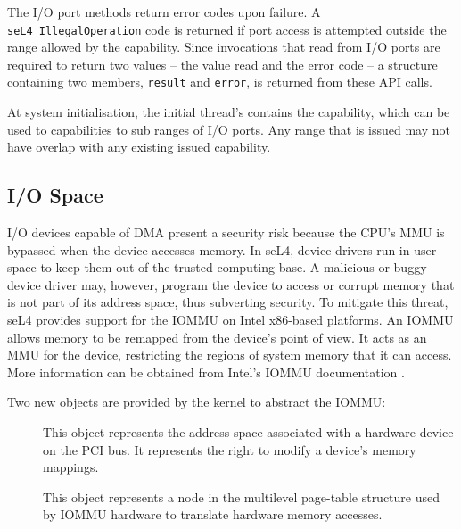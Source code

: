 The I/O port methods return error codes upon failure.
A \texttt{seL4\_IllegalOperation} code is returned if port access is
attempted outside the range allowed by the  capability. 
Since invocations that
read from I/O ports are required to return two values -- the value read
and the error code -- a structure containing two members, \texttt{result}
and \texttt{error}, is returned from these API calls.

At system initialisation, the initial thread's  contains the
 capability, which can be used to 
 capabilities to sub ranges of I/O ports. Any range that is issued
may not have overlap with any existing issued  capability.

\subsection{I/O Space}
\label{sec:iospace}

I/O devices capable of DMA present a security risk because the CPU's MMU
is bypassed when the device accesses memory. In seL4, device drivers run
in user space to keep them out of the trusted computing base.
A malicious or buggy device driver may, however, program the device to
access or corrupt memory that is not part of its address space, thus
subverting security. To mitigate this threat, seL4 provides support for
the IOMMU on Intel x86-based platforms. An IOMMU allows memory to be
remapped from the device's point of view. It acts as an MMU for the
device, restricting the regions of system memory that it can access.
More information can be obtained from Intel's IOMMU documentation \cite{extra:vtd}.

Two new objects are provided by the kernel to abstract the IOMMU:
\begin{description}

    \item[] This object represents the address space associated
    with a hardware device on the PCI bus. It represents the right to
    modify a device's memory mappings.

    \item[] This object represents a node in the multilevel
    page-table structure used by IOMMU hardware to translate hardware
    memory accesses.

\end{description}

